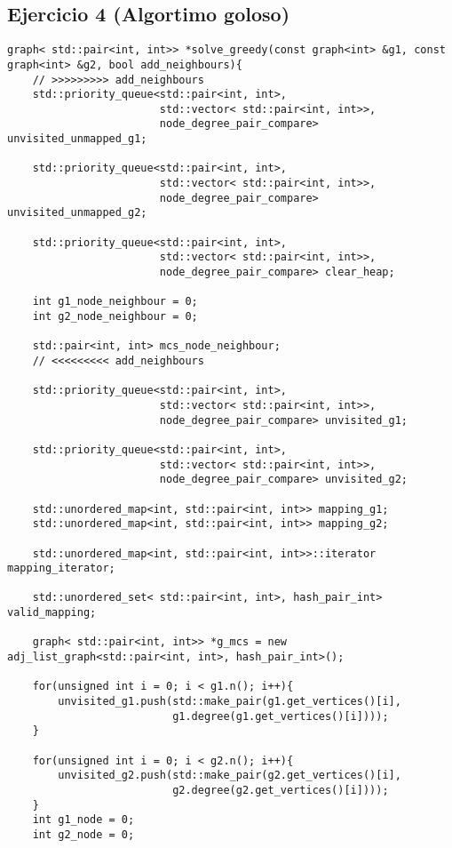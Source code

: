 \subsection{Ejercicio 4 (Algortimo goloso)}
\begin{lstlisting}
graph< std::pair<int, int>> *solve_greedy(const graph<int> &g1, const graph<int> &g2, bool add_neighbours){
    // >>>>>>>>> add_neighbours
    std::priority_queue<std::pair<int, int>,
                        std::vector< std::pair<int, int>>,
                        node_degree_pair_compare> unvisited_unmapped_g1;

    std::priority_queue<std::pair<int, int>,
                        std::vector< std::pair<int, int>>,
                        node_degree_pair_compare> unvisited_unmapped_g2;

    std::priority_queue<std::pair<int, int>,
                        std::vector< std::pair<int, int>>,
                        node_degree_pair_compare> clear_heap;

    int g1_node_neighbour = 0;
    int g2_node_neighbour = 0;

    std::pair<int, int> mcs_node_neighbour;
    // <<<<<<<<< add_neighbours

    std::priority_queue<std::pair<int, int>,
                        std::vector< std::pair<int, int>>,
                        node_degree_pair_compare> unvisited_g1;

    std::priority_queue<std::pair<int, int>,
                        std::vector< std::pair<int, int>>,
                        node_degree_pair_compare> unvisited_g2;

    std::unordered_map<int, std::pair<int, int>> mapping_g1;
    std::unordered_map<int, std::pair<int, int>> mapping_g2;

    std::unordered_map<int, std::pair<int, int>>::iterator mapping_iterator;

    std::unordered_set< std::pair<int, int>, hash_pair_int> valid_mapping;

    graph< std::pair<int, int>> *g_mcs = new adj_list_graph<std::pair<int, int>, hash_pair_int>();

    for(unsigned int i = 0; i < g1.n(); i++){
        unvisited_g1.push(std::make_pair(g1.get_vertices()[i],
                          g1.degree(g1.get_vertices()[i])));
    }

    for(unsigned int i = 0; i < g2.n(); i++){
        unvisited_g2.push(std::make_pair(g2.get_vertices()[i],
                          g2.degree(g2.get_vertices()[i])));
    }
    int g1_node = 0;
    int g2_node = 0;


\end{lstlisting}
